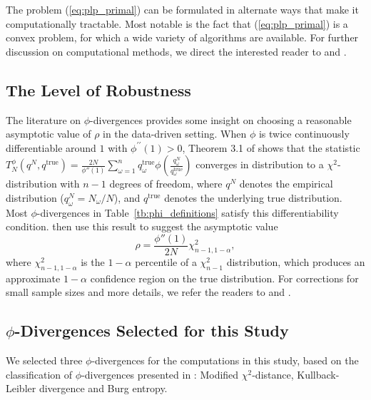 \documentclass[opre,nonblindrev]{informs3} %
\newcommand{\qtrue}{q^{\text{true}}}
\begin{document}
The problem (\ref{eq:plp_primal}) can be formulated in alternate ways that make it computationally tractable.
Most notable is the fact that (\ref{eq:plp_primal}) is a convex problem, for which a wide variety of algorithms are available.
For further discussion on computational methods, we direct the interested reader to \citep{bental2011robust} and \citep{love2013phi}.


\subsection{The Level of Robustness}
\label{ssec:robust_level}

The literature on $\phi$-divergences provides some insight on choosing a reasonable asymptotic value of $\rho$ in the data-driven setting. 
When $\phi$ is twice continuously differentiable around $1$ with $\phi^{\prime \prime}(1)>0$, Theorem 3.1 of \cite{pardo2005statistical} shows that the statistic $T^\phi_N(q^N,\qtrue) = \frac{2N}{\phi''(1)} \sum_{\omega=1}^n \qtrue_\omega \phi\left(\frac{q^N_\omega}{\qtrue_\omega}\right)$ converges in distribution to a $\chi^2$-distribution with $n-1$ degrees of freedom, where $q^N$ denotes the empirical distribution ($q^N_\omega = N_\omega/N$), and $\qtrue$ denotes the underlying true distribution.
Most $\phi$-divergences in Table~\ref{tb:phi_definitions} satisfy this differentiability condition.
\cite{bental2011robust} then use this result to suggest the asymptotic value
\begin{equation} \label{eq:asymptotic_rho}
	\rho = \frac{\phi''(1)}{2N} \chi^2_{n-1,1-\alpha},
\end{equation}
where $\chi^2_{n-1,1-\alpha}$ is the $1-\alpha$ percentile of a $\chi^2_{n-1}$ distribution, which produces an approximate $1-\alpha$ confidence region on the true distribution.
For corrections for small sample sizes and more details, we refer the readers to \citep{pardo2005statistical} and \citep{bental2011robust}.


\subsection{$\phi$-Divergences Selected for this Study}
\label{ssec:classification}

We selected three $\phi$-divergences for the computations in this study, based on the classification of $\phi$-divergences presented in \citep{love2013phi}: Modified $\chi^2$-distance, Kullback-Leibler divergence and Burg entropy.
\end{document}
